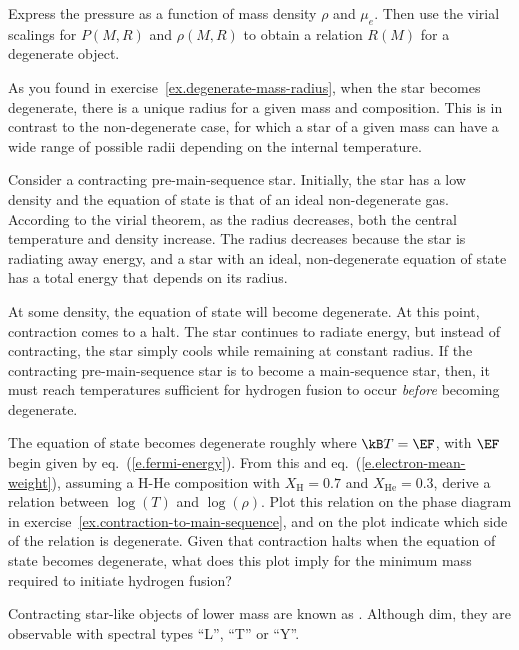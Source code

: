 \begin{exercisebox}
\label{ex.degenerate-mass-radius}
Express the pressure as a function of mass density $\rho$ and $\mu_{e}$. Then use the virial scalings for $P(M,R)$ and $\rho(M,R)$ to obtain a relation $R(M)$ for a degenerate object.
\end{exercisebox}

As you found in exercise~\ref{ex.degenerate-mass-radius}, when the star becomes degenerate, there is a unique radius for a given mass and composition. This is in contrast to the non-degenerate case, for which a star of a given mass can have a wide range of possible radii depending on the internal temperature.

Consider a contracting pre-main-sequence star. Initially, the star has a low density and the equation of state is that of an ideal non-degenerate gas. According to the virial theorem, as the radius decreases, both the central temperature and density increase. 
The radius decreases because the star is radiating away energy, and a star with an ideal, non-degenerate equation of state has a total energy that depends on its radius.

At some density, the equation of state will become degenerate. At this point, contraction comes to a halt. The star continues to radiate energy, but instead of contracting, the star simply cools while remaining at constant radius. If the contracting pre-main-sequence star is to become a main-sequence star, then, it must reach temperatures sufficient for hydrogen fusion to occur \emph{before} becoming degenerate.

\begin{exercisebox}
\label{ex.minimum-stellar-mass}
The equation of state becomes degenerate roughly where $\kB T=\EF$, with $\EF$ begin given by eq.~(\ref{e.fermi-energy}). From this and eq.~(\ref{e.electron-mean-weight}), assuming a H-He composition with $X_{\mathrm{H}} = 0.7$ and $X_{\mathrm{He}}=0.3$, derive a relation between $\log(T)$ and $\log(\rho)$. Plot this relation on the phase diagram in exercise~\ref{ex.contraction-to-main-sequence}, and on the plot indicate which side of the relation is degenerate.
Given that contraction halts when the equation of state becomes degenerate, what does this plot imply for the minimum mass required to initiate hydrogen fusion?
\end{exercisebox}

 Contracting star-like objects of lower mass are known as . Although dim, they are observable with spectral types ``L'', ``T'' or ``Y''\cite{Kirkpatrick1999Dwarfs-Cooler-t,Cushing2011The-Discovery-o}.

